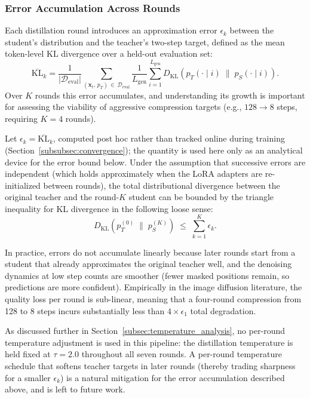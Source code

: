 \documentclass[11pt, a4paper]{article}
\begin{document}
\subsubsection{Error Accumulation Across Rounds}
\label{subsubsec:error_accumulation}

Each distillation round introduces an approximation error $\epsilon_k$ between the
student's distribution and the teacher's two-step target, defined as the mean
token-level KL divergence over a held-out evaluation set:
\begin{equation}
    \overline{\mathrm{KL}}_k = \frac{1}{|\mathcal{D}_{\text{eval}}|}
    \sum_{(\mathbf{x}_t,\, p_T) \,\in\, \mathcal{D}_{\text{eval}}}
    \frac{1}{L_{\text{gen}}} \sum_{i=1}^{L_{\text{gen}}}
    D_{\mathrm{KL}}\!\left(p_T(\cdot \mid i) \;\|\; p_S(\cdot \mid i)\right).
    \label{eq:mean_kl}
\end{equation}
Over $K$ rounds this error accumulates, and understanding its growth is important for
assessing the viability of aggressive compression targets (e.g., $128 \to 8$ steps,
requiring $K=4$ rounds).

Let $\epsilon_k = \overline{\mathrm{KL}}_k$, computed post hoc rather than tracked
online during training (Section~\ref{subsubsec:convergence}); the quantity is used
here only as an analytical device for the error bound below. Under the assumption that successive
errors are independent (which holds approximately when the LoRA adapters are
re-initialized between rounds), the total distributional divergence between the
original teacher and the round-$K$ student can be bounded by the triangle
inequality for KL divergence in the following loose sense:
\begin{equation}
    D_{\mathrm{KL}}\!\left(p_{T}^{(0)} \;\|\; p_{S}^{(K)}\right)
    \;\leq\; \sum_{k=1}^{K} \epsilon_k.
    \label{eq:error_bound}
\end{equation}

In practice, errors do not accumulate linearly because later rounds start from a
student that already approximates the original teacher well, and the denoising dynamics
at low step counts are smoother (fewer masked positions remain, so predictions are more
confident). Empirically in the image diffusion literature, the quality loss per round is
sub-linear, meaning that a four-round compression from 128 to 8 steps incurs
substantially less than $4 \times \epsilon_1$ total degradation.

As discussed further in Section~\ref{subsec:temperature_analysis}, no
per-round temperature adjustment is used in this pipeline: the distillation
temperature is held fixed at $\tau = 2.0$ throughout all seven rounds. A
per-round temperature schedule that softens teacher targets in later rounds
(thereby trading sharpness for a smaller $\epsilon_k$) is a natural mitigation
for the error accumulation described above, and is left to future work.
\end{document}
